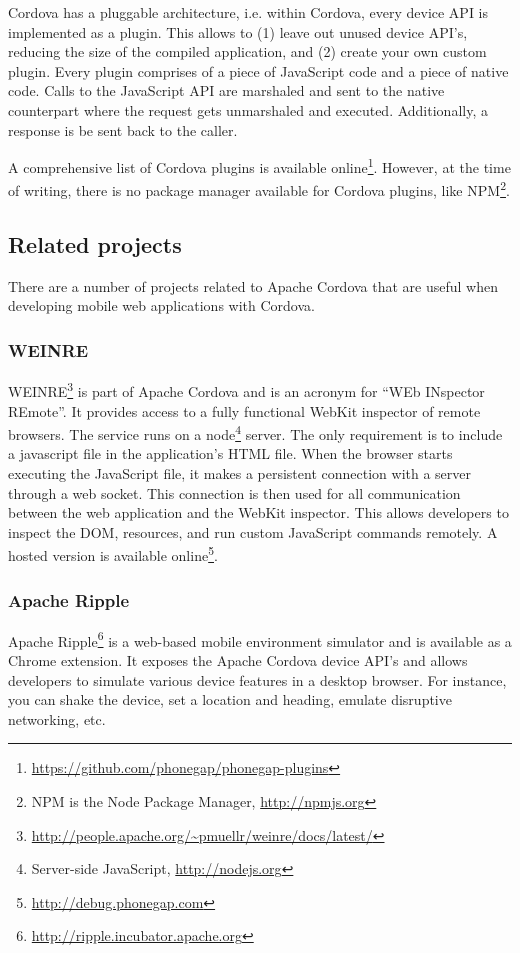 Cordova has a pluggable architecture, i.e. within Cordova, every device API is implemented as a plugin. This allows to (1) leave out unused device API's, reducing the size of the compiled application, and (2) create your own custom plugin. Every plugin comprises of a piece of JavaScript code and a piece of native code. Calls to the JavaScript API are marshaled and sent to the native counterpart where the request gets unmarshaled and executed. Additionally, a response is be sent back to the caller.

A comprehensive list of Cordova plugins is available online\footnote{\url{https://github.com/phonegap/phonegap-plugins}}. However, at the time of writing, there is no package manager available for Cordova plugins, like NPM\footnote{NPM is the Node Package Manager, \url{http://npmjs.org}}.

\subsection{Related projects}

There are a number of projects related to Apache Cordova that are useful when developing mobile web applications with Cordova.

\subsubsection{WEINRE}

WEINRE\footnote{\url{http://people.apache.org/~pmuellr/weinre/docs/latest/}} is part of Apache Cordova and is an acronym for ``WEb INspector REmote''. It provides access to a fully functional WebKit inspector of remote browsers. The service runs on a node\footnote{Server-side JavaScript, \url{http://nodejs.org}} server. The only requirement is to include a javascript file in the application's HTML file. When the browser starts executing the JavaScript file, it makes a persistent connection with a server through a web socket. This connection is then used for all communication between the web application and the WebKit inspector. This allows developers to inspect the DOM, resources, and run custom JavaScript commands remotely. A hosted version is available online\footnote{\url{http://debug.phonegap.com}}.

\subsubsection{Apache Ripple}

Apache Ripple\footnote{\url{http://ripple.incubator.apache.org}} is a web-based mobile environment simulator and is available as a Chrome extension. It exposes the Apache Cordova device API's and allows developers to simulate various device features in a desktop browser. For instance, you can shake the device, set a location and heading, emulate disruptive networking, etc.

